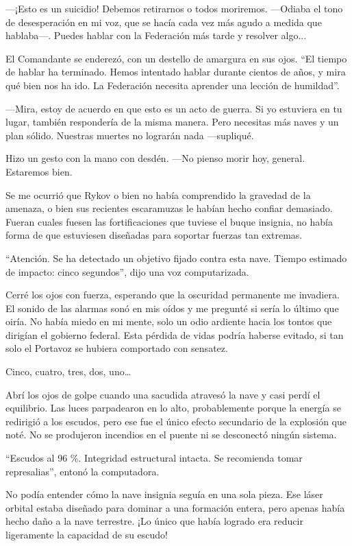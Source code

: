 —¡Esto es un suicidio! Debemos retirarnos o todos moriremos. —Odiaba el tono de desesperación en mi voz, que se hacía cada vez más agudo a medida que hablaba—. Puedes hablar con la Federación más tarde y resolver algo...

El Comandante se enderezó, con un destello de amargura en sus ojos. ``El tiempo de hablar ha terminado. Hemos intentado hablar durante cientos de años, y mira qué bien nos ha ido. La Federación necesita aprender una lección de humildad''.

—Mira, estoy de acuerdo en que esto es un acto de guerra. Si yo estuviera en tu lugar, también respondería de la misma manera. Pero necesitas más naves y un plan sólido. Nuestras muertes no lograrán nada —supliqué.

Hizo un gesto con la mano con desdén. —No pienso morir hoy, general. Estaremos bien.

Se me ocurrió que Rykov o bien no había comprendido la gravedad de la amenaza, o bien sus recientes escaramuzas le habían hecho confiar demasiado. Fueran cuales fuesen las fortificaciones que tuviese el buque insignia, no había forma de que estuviesen diseñadas para soportar fuerzas tan extremas.

``Atención. Se ha detectado un objetivo fijado contra esta nave. Tiempo estimado de impacto: cinco segundos'', dijo una voz computarizada.

Cerré los ojos con fuerza, esperando que la oscuridad permanente me invadiera. El sonido de las alarmas sonó en mis oídos y me pregunté si sería lo último que oiría. No había miedo en mi mente, solo un odio ardiente hacia los tontos que dirigían el gobierno federal. Esta pérdida de vidas podría haberse evitado, si tan solo el Portavoz se hubiera comportado con sensatez.

Cinco, cuatro, tres, dos, uno…

Abrí los ojos de golpe cuando una sacudida atravesó la nave y casi perdí el equilibrio. Las luces parpadearon en lo alto, probablemente porque la energía se redirigió a los escudos, pero ese fue el único efecto secundario de la explosión que noté. No se produjeron incendios en el puente ni se desconectó ningún sistema.

``Escudos al 96 \%. Integridad estructural intacta. Se recomienda tomar represalias'', entonó la computadora.

No podía entender cómo la nave insignia seguía en una sola pieza. Ese láser orbital estaba diseñado para dominar a una formación entera, pero apenas había hecho daño a la nave terrestre. ¡Lo único que había logrado era reducir ligeramente la capacidad de su escudo!

